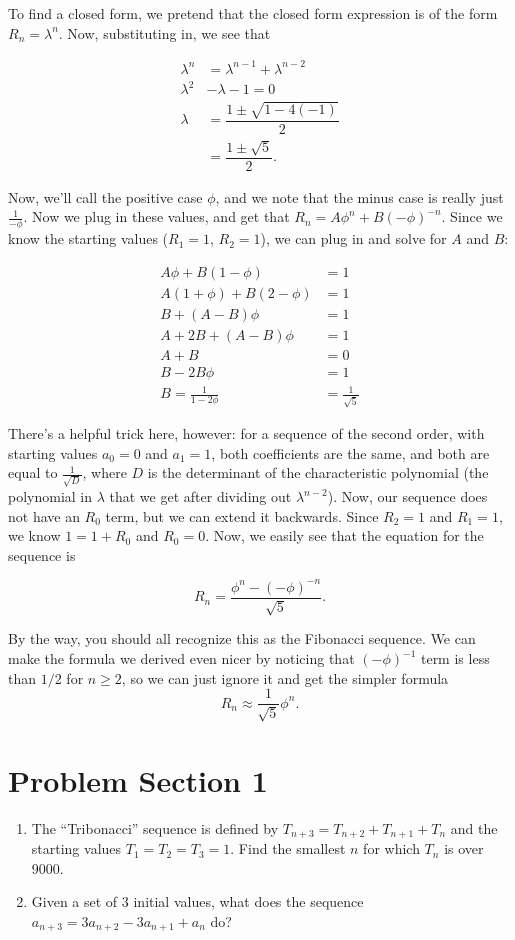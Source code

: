 \documentclass[12pt,letterpaper]{article}
\begin{document}
To find a closed form, we pretend that the closed form expression is of the
form $R_n = \lambda^n$. Now, substituting in, we see that

\begin{align*}
\lambda^n & = \lambda^{n-1} + \lambda^{n-2} \\
\lambda^2 & - \lambda - 1 = 0 \\
\lambda & = \dfrac{1 \pm \sqrt{1 - 4 (-1)}}{2} \\
        & = \dfrac{1 \pm \sqrt{5}}{2}.
\end{align*}

Now, we'll call the positive case $\phi$, and we note that the minus
case is really just $\frac1{-\phi}$. Now we plug in these values, and get
that $R_n = A \phi^n + B (-\phi)^{-n}$. Since we know the starting
values ($R_1 = 1$, $R_2 = 1$), we can plug in and solve for $A$ and
$B$:

\begin{align*}
  A \phi + B (1 - \phi) & = 1 \\
  A (1 + \phi) + B (2 - \phi) & = 1 \\
  B + (A - B) \phi & = 1 \\
  A + 2B + (A - B)\phi & = 1 \\
  A + B & = 0 \\
  B - 2B \phi & = 1 \\
  B = \frac{1}{1-2\phi} & = \frac1{\sqrt{5}}
\end{align*}

There's a helpful trick here, however: for a sequence of the second
order, with starting values $a_0 = 0$ and $a_1 = 1$, both coefficients
are the same, and both are equal to $\frac1{\sqrt{D}}$, where $D$ is the
determinant of the characteristic polynomial (the polynomial
in $\lambda$ that we get after dividing out $\lambda^{n-2}$). Now, our
sequence does not have an $R_0$ term, but we can extend it
backwards. Since $R_2 = 1$ and $R_1 = 1$, we know $1 = 1 + R_0$ and $R_0 = 0$.
Now, we easily see that the equation for the sequence is

$$R_n = \frac{\phi^n - (-\phi)^{-n}}{\sqrt{5}}.$$

By the way, you should all recognize this as the Fibonacci sequence. We
can make the formula we derived even nicer by noticing that
$(-\phi)^{-1}$ term is less than $1/2$ for $n \ge 2$, so we can just ignore
it and get the simpler formula $$R_n \approx
\frac1{\sqrt{5}} \phi^n.$$

\section{Problem Section 1}
\begin{enumerate}
  \item The ``Tribonacci'' sequence is defined by $T_{n+3} = T_{n+2} + T_{n+1}
  + T_n$ and the starting values $T_1 = T_2 = T_3 = 1$. Find the smallest $n$ for which $T_n$ is over
  9000.
  \item Given a set of 3 initial values, what does the sequence $a_{n+3} =
  3a_{n+2} - 3a_{n+1} + a_n$ do?
\end{enumerate}
\end{document}
